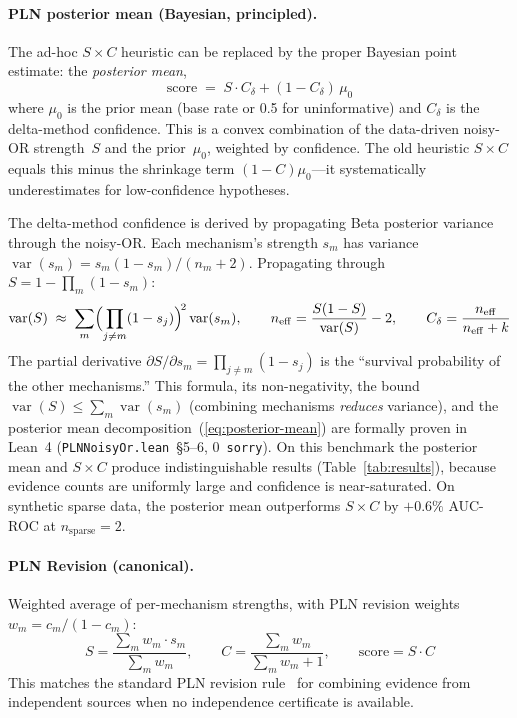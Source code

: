 \documentclass[]{article}
\newcommand{\code}[1]{\texttt{#1}}
\begin{document}
\paragraph{PLN posterior mean (Bayesian, principled).}
The ad-hoc $S \times C$ heuristic can be replaced by the proper Bayesian
point estimate: the \emph{posterior mean},
\begin{equation}
  \text{score} \;=\; S \cdot C_\delta + (1 - C_\delta)\,\mu_0
  \label{eq:posterior-mean}
\end{equation}
where $\mu_0$ is the prior mean (base rate or 0.5 for uninformative) and
$C_\delta$ is the delta-method confidence.  This is a convex combination of
the data-driven noisy-OR strength~$S$ and the prior~$\mu_0$, weighted by
confidence.  The old heuristic $S \times C$ equals this minus the
shrinkage term $(1-C)\mu_0$---it systematically underestimates for
low-confidence hypotheses.

The delta-method confidence is derived by propagating Beta posterior
variance through the noisy-OR.  Each mechanism's strength $s_m$ has variance
$\operatorname{var}(s_m) = s_m(1-s_m)/(n_m+2)$.
Propagating through $S = 1 - \prod_m(1-s_m)$:
\begin{equation}
  \operatorname{var}(S) \;\approx\; \sum_m \Bigl(\prod_{j \neq m}(1-s_j)\Bigr)^{\!2} \operatorname{var}(s_m),
  \qquad n_{\mathrm{eff}} = \frac{S(1-S)}{\operatorname{var}(S)} - 2,
  \qquad C_\delta = \frac{n_{\mathrm{eff}}}{n_{\mathrm{eff}} + k}
  \label{eq:delta-method}
\end{equation}
The partial derivative $\partial S / \partial s_m = \prod_{j\neq m}(1-s_j)$
is the ``survival probability of the other mechanisms.''  This formula,
its non-negativity, the bound $\operatorname{var}(S) \le \sum_m
\operatorname{var}(s_m)$ (combining mechanisms \emph{reduces} variance),
and the posterior mean decomposition~(\ref{eq:posterior-mean})
are formally proven in Lean~4 (\code{PLNNoisyOr.lean}~\S5--6, 0~\code{sorry}).
On this benchmark the posterior mean and $S \times C$ produce
indistinguishable results (Table~\ref{tab:results}), because evidence
counts are uniformly large and confidence is near-saturated.  On synthetic
sparse data, the posterior mean outperforms $S \times C$ by
$+0.6\%$ AUC-ROC at $n_{\mathrm{sparse}}=2$.

\paragraph{PLN Revision (canonical).}
Weighted average of per-mechanism strengths, with PLN revision weights $w_m = c_m / (1 - c_m)$:
\begin{equation}
  S = \frac{\sum_m w_m \cdot s_m}{\sum_m w_m}, \qquad
  C = \frac{\sum_m w_m}{\sum_m w_m + 1}, \qquad
  \text{score} = S \cdot C
  \label{eq:pln-revision}
\end{equation}
This matches the standard PLN revision rule~\cite{Goertzel2008PLN}
for combining evidence from independent sources when no independence
certificate is available.
\end{document}
